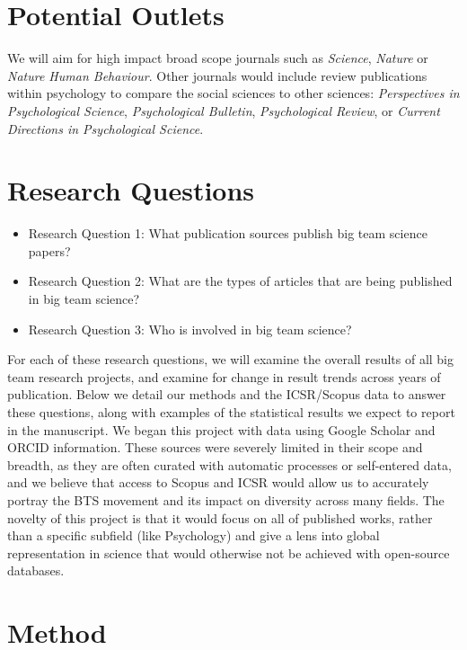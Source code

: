 \documentclass[
  man]{apa7}
\providecommand{\tightlist}{%
  \setlength{\itemsep}{0pt}\setlength{\parskip}{0pt}}
\begin{document}
\hypertarget{potential-outlets}{%
\section{Potential Outlets}\label{potential-outlets}}

We will aim for high impact broad scope journals such as \emph{Science},
\emph{Nature} or \emph{Nature Human Behaviour}. Other journals would include
review publications within psychology to compare the social sciences to
other sciences: \emph{Perspectives in Psychological Science}, \emph{Psychological
Bulletin}, \emph{Psychological Review}, or \emph{Current Directions in
Psychological Science}.

\hypertarget{research-questions}{%
\section{Research Questions}\label{research-questions}}

\begin{itemize}
\tightlist
\item
  Research Question 1: What publication sources publish big team
  science papers?
\item
  Research Question 2: What are the types of articles that are being
  published in big team science?
\item
  Research Question 3: Who is involved in big team science?
\end{itemize}

For each of these research questions, we will examine the overall
results of all big team research projects, and examine for change in
result trends across years of publication. Below we detail our methods
and the ICSR/Scopus data to answer these questions, along with examples
of the statistical results we expect to report in the manuscript. We
began this project with data using Google Scholar and ORCID information.
These sources were severely limited in their scope and breadth, as they
are often curated with automatic processes or self-entered data, and we
believe that access to Scopus and ICSR would allow us to accurately
portray the BTS movement and its impact on diversity across many fields.
The novelty of this project is that it would focus on all of published
works, rather than a specific subfield (like Psychology) and give a lens
into global representation in science that would otherwise not be
achieved with open-source databases.

\hypertarget{method}{%
\section{Method}\label{method}}
\end{document}
